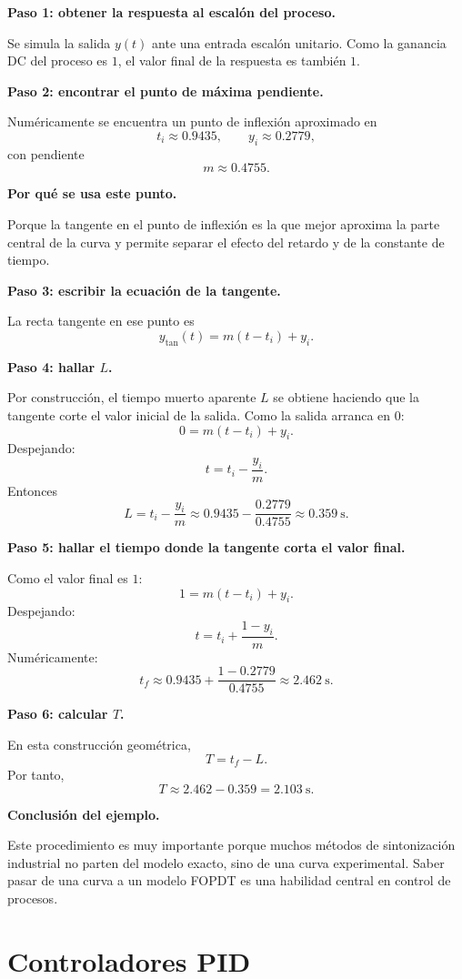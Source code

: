 \documentclass[11pt]{article}
\begin{document}
\textbf{Paso 1: obtener la respuesta al escal\'on del proceso.}

Se simula la salida $y(t)$ ante una entrada escal\'on unitario. Como la ganancia DC del proceso es $1$, el valor final de la respuesta es tambi\'en $1$.

\textbf{Paso 2: encontrar el punto de m\'axima pendiente.}

Num\'ericamente se encuentra un punto de inflexi\'on aproximado en
\[
t_i\approx 0.9435,\qquad y_i\approx 0.2779,
\]
con pendiente
\[
m\approx 0.4755.
\]

\textbf{Por qu\'e se usa este punto.}

Porque la tangente en el punto de inflexi\'on es la que mejor aproxima la parte central de la curva y permite separar el efecto del retardo y de la constante de tiempo.

\textbf{Paso 3: escribir la ecuaci\'on de la tangente.}

La recta tangente en ese punto es
\[
y_{\text{tan}}(t)=m(t-t_i)+y_i.
\]

\textbf{Paso 4: hallar $L$.}

Por construcci\'on, el tiempo muerto aparente $L$ se obtiene haciendo que la tangente corte el valor inicial de la salida. Como la salida arranca en $0$:
\[
0=m(t-t_i)+y_i.
\]
Despejando:
\[
t=t_i-\frac{y_i}{m}.
\]
Entonces
\[
L=t_i-\frac{y_i}{m}
\approx 0.9435-\frac{0.2779}{0.4755}
\approx 0.359~\text{s}.
\]

\textbf{Paso 5: hallar el tiempo donde la tangente corta el valor final.}

Como el valor final es $1$:
\[
1=m(t-t_i)+y_i.
\]
Despejando:
\[
t=t_i+\frac{1-y_i}{m}.
\]
Num\'ericamente:
\[
t_f\approx 0.9435+\frac{1-0.2779}{0.4755}\approx 2.462~\text{s}.
\]

\textbf{Paso 6: calcular $T$.}

En esta construcci\'on geom\'etrica,
\[
T=t_f-L.
\]
Por tanto,
\[
T\approx 2.462-0.359=2.103~\text{s}.
\]

\textbf{Conclusi\'on del ejemplo.}

Este procedimiento es muy importante porque muchos m\'etodos de sintonizaci\'on industrial no parten del modelo exacto, sino de una curva experimental. Saber pasar de una curva a un modelo FOPDT es una habilidad central en control de procesos.

\section{Controladores PID}
\end{document}

